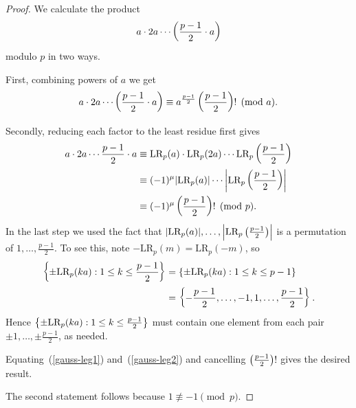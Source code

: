 \begin{proof}
We calculate the product
\[
a\cdot 2a\cdots \left( {\frac{p-1}{2}\cdot a} \right)
\]
modulo $p$ in two ways.

First, combining powers of $a$ we get
\begin{equation}\label{gauss-leg1}
a\cdot 2a\cdots \left( {\frac{p-1}{2}\cdot a} \right)
\equiv a^{\frac{p-1}{2}}\left( {\frac{p-1}{2}} \right)!\pmod{a}.
\end{equation}

Secondly, reducing each factor to the least residue first gives
\begin{align}
\nonumber a\cdot 2a\cdots \frac{p-1}{2}\cdot a
&\equiv \text{LR}_p(a)\cdot \text{LR}_p(2a)\cdots \text{LR}_p\left( {\frac{p-1}{2}} \right)\\
\nonumber &\equiv (-1)^{\mu}|\text{LR}_p(a)|\cdots \left| {\text{LR}_p\left( {\frac{p-1}{2}} \right)} \right|\\
&\equiv (-1)^{\mu} \left( {\frac{p-1}{2}} \right)!\pmod{p}.\label{gauss-leg2}
\end{align}
In the last step we used the fact that $|\text{LR}_p(a)|,\ldots ,\left| {\text{LR}_p\left( {\frac{p-1}{2}} \right)} \right|$ is a permutation of $1,\ldots, \frac{p-1}2$. To see this, note $-\text{LR}_p(m)=\text{LR}_p(-m)$, so
\begin{align*}
\left\{{\pm\text{LR}_p(ka)}:{1\le k\le \frac{p-1}2}\right\}
&=\left\{{\pm\text{LR}_p(ka)}:{1\le k\le p-1}\right\}\\
&=\left\{ {-\frac{p-1}{2},\ldots, -1, 1, \ldots, \frac{p-1}2} \right\}.
\end{align*}
Hence $\left\{{\pm\text{LR}_p(ka)}:{1\le k\le \frac{p-1}2}\right\}$ must contain one element from each pair $\pm 1, \ldots, \pm \frac{p-1}{2}$, as needed.

Equating~(\ref{gauss-leg1}) and~(\ref{gauss-leg2}) and cancelling $\left( {\frac{p-1}{2}} \right)!$ gives the desired result.

The second statement follows because $1\nequiv -1\pmod{p}$.
\end{proof}

